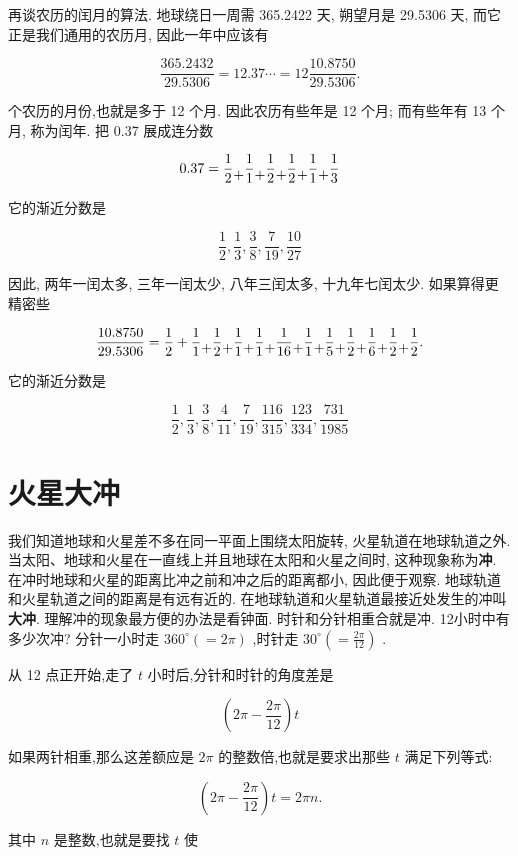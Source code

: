 \documentclass{ctexart}
\newcommand{\cplus}{\raisebox{-1ex}{+}}
\begin{document}
再谈农历的闰月的算法. 地球绕日一周需 365.2422 天, 朔望月是 29.5306 天, 而它正是我们通用的农历月, 因此一年中应该有

\[
\frac{365.2432}{29.5306} = {12.37}\cdots = {12}\frac{10.8750}{29.5306}.
\]

个农历的月份,也就是多于 12 个月. 因此农历有些年是 12 个月; 而有些年有 13 个月, 称为闰年. 把 0.37 展成连分数

\[
{0.37} = \frac{1}{2} \cplus \frac{1}{1} \cplus \frac{1}{2} \cplus \frac{1}{2} \cplus \frac{1}{1} \cplus \frac{1}{3}
\]

它的渐近分数是

\[
\frac{1}{2},\frac{1}{3},\frac{3}{8},\frac{7}{19},\frac{10}{27}
\]

因此, 两年一闰太多, 三年一闰太少, 八年三闰太多, 十九年七闰太少. 如果算得更精密些

\[
\frac{10.8750}{29.5306} = \frac{1}{2} + \frac{1}{1} \cplus \frac{1}{2} \cplus \frac{1}{1} \cplus \frac{1}{1} \cplus \frac{1}{16} \cplus \frac{1}{1} \cplus \frac{1}{5} \cplus \frac{1}{2} \cplus \frac{1}{6} \cplus \frac{1}{2} \cplus \frac{1}{2}\text{.}
\]

它的渐近分数是

\[
\frac{1}{2},\frac{1}{3}, \frac{3}{8}, \frac{4}{11}, \frac{7}{19}, \frac{116}{315}, \frac{123}{334}, \frac{731}{1985}
\]

\section{火星大冲}

我们知道地球和火星差不多在同一平面上围绕太阳旋转, 火星轨道在地球轨道之外. 当太阳、地球和火星在一直线上并且地球在太阳和火星之间时, 这种现象称为\textbf{冲}. 在冲时地球和火星的距离比冲之前和冲之后的距离都小, 因此便于观察. 地球轨道和火星轨道之间的距离是有远有近的. 在地球轨道和火星轨道最接近处发生的冲叫\textbf{大冲}. 理解冲的现象最方便的办法是看钟面. 时针和分针相重合就是冲. 12小时中有多少次冲? 分针一小时走 \({360}^{ \circ }\left( { = {2\pi }}\right)\) ,时针走 \({30}^{ \circ }\left( { = \frac{2\pi }{12}}\right)\) .

从 12 点正开始,走了 \(t\) 小时后,分针和时针的角度差是

\[
\left( {{2\pi } - \frac{2\pi }{12}}\right) t
\]

如果两针相重,那么这差额应是 \({2\pi }\) 的整数倍,也就是要求出那些 \(t\) 满足下列等式:

\[
\left( {{2\pi } - \frac{2\pi }{12}}\right) t = {2\pi n}.
\]

其中 \(n\) 是整数,也就是要找 \(t\) 使
\end{document}
